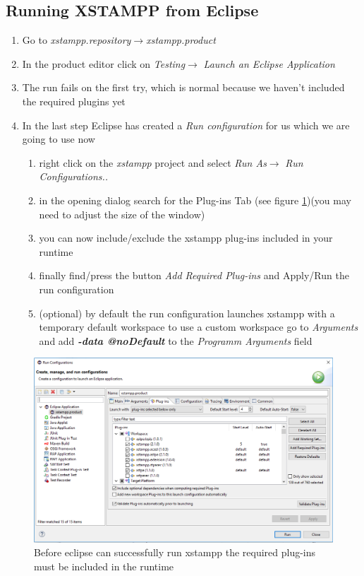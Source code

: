 \subsection{Running XSTAMPP from Eclipse}
\begin{enumerate}
\item Go to \textit{xstampp.repository}$\rightarrow$\textit{xstampp.product}
\item In the product editor click on  \textit{Testing}$\rightarrow$ \textit{Launch an Eclipse Application}
\item The run fails on the first try, which is normal because we haven't included the required plugins yet
\item In the last step Eclipse has created a \textit{Run configuration} for us which we are going to use now
	\begin{enumerate}
	\item right click on the \textit{xstampp} project and select \textit{Run As}$\rightarrow$ \textit{Run Configurations..}
	\item in the opening dialog search for the Plug-ins Tab (see figure \ref{fig:runConfig})(you may need to adjust the size of the window)
	\item you can now include/exclude the xstampp plug-ins included in your runtime
	\item finally find/press the button \textit{Add Required Plug-ins} and Apply/Run the run configuration
	\item (optional) by default the run configuration launches xstampp with a temporary default workspace to use a custom workspace go to \textit{Arguments} and add \textit{\textbf{-data @noDefault}} to the \textit{Programm Arguments} field
	\end{enumerate}
\end{enumerate}
\begin{figure}[H]
\includegraphics[scale=0.5]{images/runConfig.png}
\caption{Before eclipse can successfully run xstampp the required plug-ins must be included in the runtime}
\label{fig:runConfig}
\end{figure}

